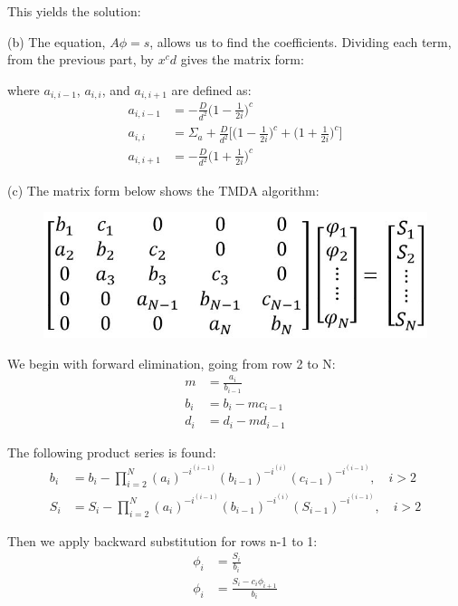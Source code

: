 \documentclass{amsart}
\theoremstyle{definition}
\begin{document}
This yields the solution:


(b) The equation, $A\phi = s$, allows us to find the coefficients.
Dividing each term, from the previous part, by $x^cd$ gives the matrix form:
\bigbreak

\bigbreak

where $a_{i,i-1}$, $a_{i,i}$, and $a_{i,i+1}$ are defined as:
\begin{align*}
    a_{i,i-1} &= -\frac{D}{d^2}\bigg(1-\frac{1}{2i}\bigg)^c \\
    a_{i,i} &= \Sigma_a+\frac{D}{d^2}\bigg[\bigg(1-\frac{1}{2i}\bigg)^c+ \bigg(1+\frac{1}{2i}\bigg)^c\bigg] \\
    a_{i,i+1} &= -\frac{D}{d^2}\bigg(1+\frac{1}{2i}\bigg)^c
\end{align*}
\bigbreak



(c) The matrix form below shows the TMDA algorithm:
\begin{figure}[h!]
    \includegraphics[width=.5\linewidth]{TDMA}
\end{figure}
\bigbreak


We begin with forward elimination, going from row 2 to N:
\begin{align*}
    m &= \frac{a_i}{b_{i-1}} \\
    b_i &= b_i - mc_{i-1} \\
    d_i &= d_i - md_{i-1}
\end{align*}

The following product series is found:
\begin{align*}
    b_i &= b_i - \prod_{i = 2}^{N} (a_i)^{-i^{(i-1)}} (b_{i-1})^{-i^{(i)}} (c_{i-1})^{-i^{(i-1)}}, \quad i>2 \\
    S_i &= S_i - \prod_{i = 2}^{N} (a_i)^{-i^{(i-1)}} (b_{i-1})^{-i^{(i)}} (S_{i-1})^{-i^{(i-1)}}, \quad i>2
\end{align*}

Then we apply backward substitution for rows n-1 to 1:
\begin{align*}
    \phi_i &= \frac{S_i}{b_i} \\
    \phi_i &= \frac{S_i-c_i\phi_{i+1}}{b_i}
\end{align*}
\end{document}

